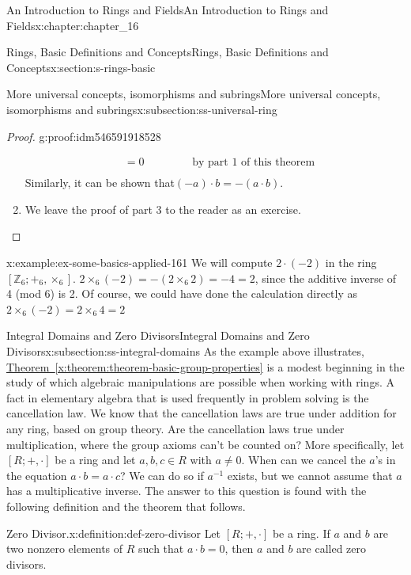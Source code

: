 \documentclass[oneside,10pt,]{book}
\newcommand{\xreffont}{\relax}
\numberwithin{equation}{section}
\begin{document}
\begin{chapterptx}{An Introduction to Rings and Fields}{}{An Introduction to Rings and Fields}{}{}{x:chapter:chapter_16}
\begin{sectionptx}{Rings, Basic Definitions and Concepts}{}{Rings, Basic Definitions and Concepts}{}{}{x:section:s-rings-basic}
\begin{subsectionptx}{More universal concepts, isomorphisms and subrings}{}{More universal concepts, isomorphisms and subrings}{}{}{x:subsection:ss-universal-ring}
\begin{proof}{}{g:proof:idm546591918528}
\begin{enumerate}[label=(\arabic*)]
\begin{equation*}
\begin{split}
& = 0\quad \quad \quad\quad \textrm{     by  part 1  of this  theorem}\\
\end{split}
\end{equation*}
Similarly, it can be shown that\((-a) \cdot  b = -(a \cdot  b)\).%
\item{}We leave the proof of part 3 to the reader as an exercise.%
\end{enumerate}
%
\end{proof}
\begin{example}{}{x:example:ex-some-basics-applied-161}%
We will compute \(2 \cdot (-2)\) in the ring \(\left[\mathbb{Z}_6;+_6,\times_6\right]\). \(2 \times_6 (-2) = -\left(2\times_6 2\right)= -4 = 2\), since the additive inverse of 4 (mod 6) is 2. Of course, we could have done the calculation directly as \(2 \times_6 (-2) = 2 \times_6 4 = 2\)%
\end{example}
\end{subsectionptx}
%
%
\typeout{************************************************}
\typeout{************************************************}
%
\begin{subsectionptx}{Integral Domains and Zero Divisors}{}{Integral Domains and Zero Divisors}{}{}{x:subsection:ss-integral-domains}
As the example above illustrates, \hyperref[x:theorem:theorem-basic-group-properties]{Theorem~{\xreffont\ref{x:theorem:theorem-basic-group-properties}}} is a modest beginning in the study of which algebraic manipulations are possible when working with rings. A fact in elementary algebra that is used frequently in problem solving is the cancellation law. We know that the cancellation laws are true under addition for any ring, based on group theory. Are the cancellation laws true under multiplication, where the group axioms can't be counted on? More specifically, let \([R; +, \cdot ]\) be a ring and let \(a, b, c\in R\) with \(a \neq 0\). When can we cancel the \(a\)'s in the equation \(a \cdot  b = a \cdot  c\)? We can  do so if \(a^{-1}\) exists, but we cannot assume that \(a\) has a multiplicative inverse. The answer to this question is found with the following definition and the theorem that follows.%
\begin{definition}{Zero Divisor.}{x:definition:def-zero-divisor}%
%
\label{g:notation:idm546591901792}%
Let \([R; +, \cdot ]\) be a ring.  If \(a\) and \(b\) are two nonzero elements of \(R\) such that \(a \cdot  b = 0\), then \(a\) and \(b\) are called zero divisors.%

\end{definition}
\end{subsectionptx}
\end{sectionptx}
\end{chapterptx}
\end{document}
